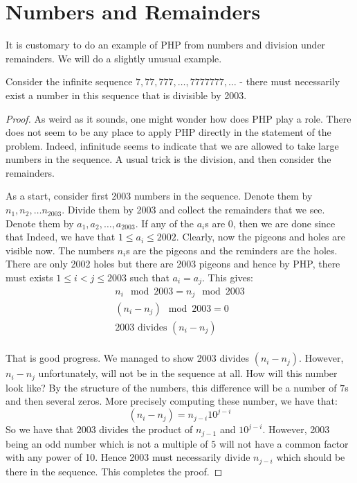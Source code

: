 \section{Numbers and Remainders}

It is customary to do an example of PHP from numbers and division under remainders. We will do a slightly unusual example. 

\begin{theorem}
Consider the infinite sequence $7, 77, 777, \ldots ,7777777, \ldots $ - there must necessarily exist a number in this sequence that is divisible by 2003.
\end{theorem}
\begin{proof}
As weird as it sounds, one might wonder how does PHP play a role. There does not seem to be any place to apply PHP directly in the statement of the problem. Indeed, infinitude seems to indicate that we are allowed to take large numbers in the sequence. A usual trick is the division, and then consider the remainders.

As a start, consider  first 2003 numbers in the sequence. Denote them by $n_1, n_2, \ldots n_{2003}$. Divide them by 2003 and collect the remainders that we see. Denote them by $a_1, a_2, \ldots, a_{2003}$. If any of the $a_i$s are 0, then we are done since that  Indeed, we have that $1 \le a_i \le 2002$. Clearly, now the pigeons and holes are visible now. The numbers $n_i$s are the pigeons and the reminders are the holes. There are only 2002 holes but there are 2003 pigeons and hence by PHP, there must exists $1 \le i < j \le 2003$ such that $a_i = a_j$. This gives:
\begin{eqnarray}
n_i  \mod 2003 = n_j \mod 2003 \\
(n_i - n_j) \mod 2003 =  0\\
2003 \textrm{ divides } (n_i - n_j) \\
\end{eqnarray}

That is good progress. We managed to show 2003 divides $(n_i - n_j)$. However, $n_i - n_j$ unfortunately, will not be in the sequence at all. How will this number look like? By the structure of the numbers, this difference will be a number of $7$s and then several zeros. More precisely computing these number, we have that:
$$(n_i - n_j) = n_{j-i} 10^{j-i}$$
So we have that $2003$ divides the product of $n_{j-1}$ and $10^{j-i}$. However, 2003 being an odd number which is not a multiple of $5$ will not have a common factor with any power of 10. Hence 2003 must necessarily divide $n_{j-i}$ which should be there in the sequence. This completes the proof.
\end{proof}

